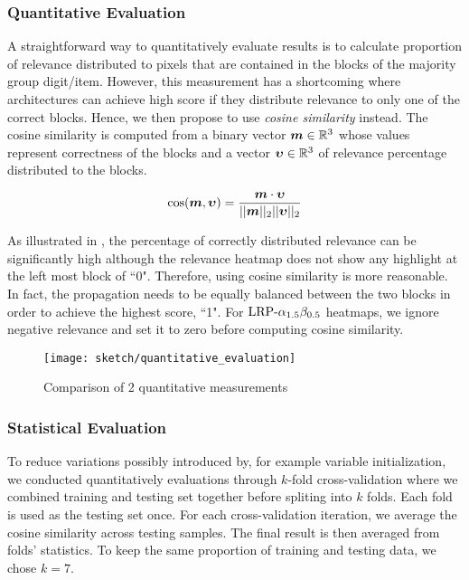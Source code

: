 \subsubsection{Quantitative Evaluation}
A straightforward way to quantitatively evaluate results is to calculate proportion of relevance distributed to pixels that are contained in the blocks of the majority group digit/item. However, this measurement has a shortcoming where architectures can achieve high score if they distribute relevance to only one of the correct blocks. Hence, we then propose to use \textit{cosine similarity} instead. The cosine similarity is computed from  a  binary  vector $\patvector{m} \in \mathbb{R}^3$  whose values represent correctness of the blocks and a vector $\patvector{\upsilon} \in \mathbb{R}^3$ of relevance percentage distributed to the blocks. 

\begin{align}
\cos (\patvector{m}, \patvector{\upsilon}) = \frac{ \patvector{m} \cdot \patvector{\upsilon}}{ || \patvector{m}  ||_2 ||\patvector{\upsilon}   ||_2}	
\end{align}

As illustrated in \addfigure{\ref{fig:quantitative_evaluation}}, the percentage of correctly distributed relevance can be significantly high although the relevance heatmap does not show any highlight at the left most block of ``0". Therefore, using cosine similarity is more reasonable. In fact, the propagation needs to be equally balanced between the two blocks in order to achieve the highest score, ``1". For $\text{LRP-}\alpha_{1.5}\beta_{0.5}$ heatmaps, we ignore negative relevance and set it to zero before computing cosine similarity.

\begin{figure}[!htb]
\centering
\texttt{[image: sketch/quantitative\_evaluation]}
\caption{Comparison of 2 quantitative measurements} 
\label{fig:quantitative_evaluation}
\end{figure}

\subsubsection{Statistical Evaluation}
To reduce variations possibly introduced by, for example variable initialization, we conducted quantitatively evaluations through $k$-fold cross-validation where we combined  training and testing set together before spliting into $k$ folds. Each fold is used as the testing set once. For each cross-validation iteration, we average the cosine similarity across testing samples. The final result is then averaged from folds' statistics.  To keep the same proportion of training and testing data, we chose $k=7$. 

